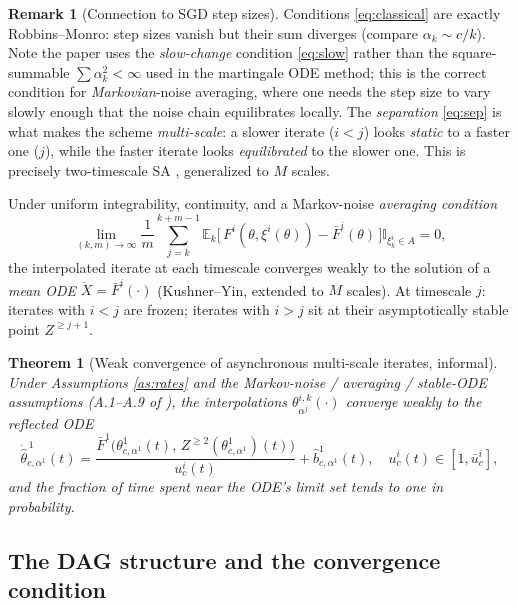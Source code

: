\documentclass[11pt]{article}
\theoremstyle{plain}
\newtheorem{theorem}{Theorem}
\theoremstyle{definition}
\newtheorem{remark}{Remark}
\newcommand{\E}{\mathbb{E}}
\begin{document}
\begin{remark}[Connection to SGD step sizes]
Conditions \eqref{eq:classical} are exactly Robbins--Monro: step sizes vanish
but their sum diverges (compare $\alpha_k\sim c/k$). Note the paper uses the
\emph{slow-change} condition \eqref{eq:slow} rather than the square-summable
$\sum\alpha_k^2<\infty$ used in the martingale ODE method; this is the correct
condition for \emph{Markovian}-noise averaging, where one needs the step size
to vary slowly enough that the noise chain equilibrates locally. The
\emph{separation} \eqref{eq:sep} is what makes the scheme \emph{multi-scale}:
a slower iterate ($i<j$) looks \emph{static} to a faster one ($j$), while the
faster iterate looks \emph{equilibrated} to the slower one. This is precisely
two-timescale SA \cite{borkar}, generalized to $M$ scales.
\end{remark}

Under uniform integrability, continuity, and a Markov-noise \emph{averaging
condition}
\begin{equation}
  \lim_{(k,m)\to\infty}\frac{1}{m}\sum_{j=k}^{k+m-1}
  \E_k\!\big[\,F^i(\theta,\xi^i(\theta)) - \bar F^i(\theta)\,\big]
  \mathbb{I}_{\xi^i_k\in A} = 0,
\end{equation}
the interpolated iterate at each timescale converges weakly to the solution of
a \emph{mean ODE} $\dot X = \bar F^i(\cdot)$ (Kushner--Yin, extended to $M$
scales). At timescale $j$: iterates with $i<j$ are frozen; iterates with $i>j$
sit at their asymptotically stable point $Z^{\ge j+1}$.

\begin{theorem}[Weak convergence of asynchronous multi-scale iterates, informal]
\label{thm:weakconv}
Under Assumptions \ref{as:rates} and the Markov-noise / averaging /
stable-ODE assumptions (A.1--A.9 of \cite{P2}), the interpolations
$\theta^{i,k}_{\alpha^j}(\cdot)$ converge weakly to the reflected ODE
\begin{equation}
  \dot{\hat\theta}^{\,1}_{c,\alpha^1}(t)
  = \frac{\bar F^1\!\big(\theta^1_{c,\alpha^1}(t),\, Z^{\ge2}(\theta^1_{c,\alpha^1})(t)\big)}
         {u^i_c(t)} + \hat b^1_{c,\alpha^1}(t),
  \quad u^i_c(t)\in[1,\bar u^i_c],
\end{equation}
and the fraction of time spent near the ODE's limit set tends to one in
probability.
\end{theorem}

\subsection{The DAG structure and the convergence condition}
\end{document}
